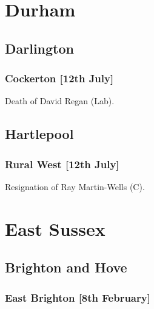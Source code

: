 \documentclass[a4paper,openany]{book}
\begin{document}
\begin{resultsiii}
\section{Durham}

\subsection*{Darlington}

\subsubsection*{Cockerton \hspace*{\fill}\nolinebreak[1]%
\enspace\hspace*{\fill}
[12th July]}


Death of David Regan (Lab).

\subsection*{Hartlepool}

\subsubsection*{Rural West \hspace*{\fill}\nolinebreak[1]%
\enspace\hspace*{\fill}
[12th July]}


Resignation of Ray Martin-Wells (C).

\section{East Sussex}

\subsection*{Brighton and Hove}

\subsubsection*{East Brighton \hspace*{\fill}\nolinebreak[1]%
\enspace\hspace*{\fill}
[8th February]}


\end{resultsiii}
\end{document}
